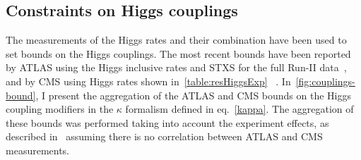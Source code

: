 \subsection{Constraints on Higgs couplings}
The measurements of the Higgs rates and their combination have been used to set bounds on the Higgs couplings. The most recent bounds have been reported by ATLAS using the Higgs inclusive rates and STXS for the full Run-II data~\cite{ATLAS2021vrm}, and by CMS using Higgs rates shown in~\autoref{table:resHiggsExp} ~\cite{CMS:2020gsy}. In~\autoref{fig:couplings-bound}, I present the aggregation of the ATLAS and CMS bounds on the Higgs coupling modifiers in the $\kappa$ formalism defined in eq.~\eqref{kappa}. The aggregation of these bounds was performed
taking into account the experiment effects, as described in~\cite{30688c22e51b409197a8639f2a496516} assuming there is no correlation between ATLAS and CMS measurements.  
